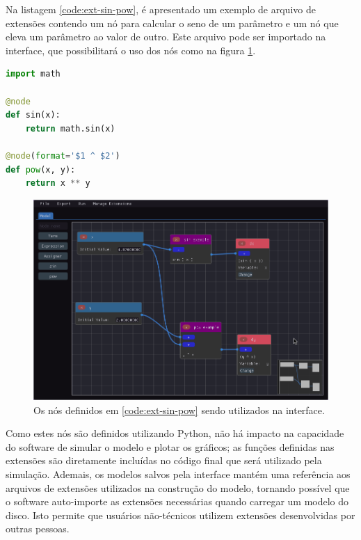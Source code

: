 \documentclass[
	12pt,				%
	openright,			%
	oneside,			%
	a4paper,			%
	main=brazil,
	english,			%
	]{ufsj-abntex2}
\begin{document}
Na listagem \ref{code:ext-sin-pow}, é apresentado um exemplo de arquivo de extensões contendo um nó para calcular o seno de um parâmetro e um nó que eleva um parâmetro ao valor de outro. Este arquivo pode ser importado na interface, que possibilitará o uso dos nós como na figura \ref{fig:ext-sin-pow}.

\begin{lstlisting}[language=Python, label=code:ext-sin-pow, caption=Exemplo de definição dos nós de extensão seno e potência com código Python válido., float, xleftmargin=.35\textwidth]
import math

@node
def sin(x):
    return math.sin(x)

@node(format='$1 ^ $2')
def pow(x, y):
    return x ** y

\end{lstlisting}

\begin{figure}[h]
    \centering
    \includegraphics[scale=0.45]{imgs/ode-designer/ext-sin-pow.png} 
    \caption{Os nós definidos em \ref{code:ext-sin-pow} sendo utilizados na interface.}
    \label{fig:ext-sin-pow}
\end{figure}

Como estes nós são definidos utilizando Python, não há impacto na capacidade do software de simular o modelo e plotar os gráficos; as funções definidas nas extensões são diretamente incluídas no código final que será utilizado pela simulação. Ademais, os modelos salvos pela interface mantém uma referência aos arquivos de extensões utilizados na construção do modelo, tornando possível que o software auto-importe as extensões necessárias quando carregar um modelo do disco. Isto permite que usuários não-técnicos utilizem extensões desenvolvidas por outras pessoas.
\end{document}
